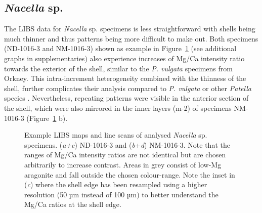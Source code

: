 \documentclass[
  authoryear,
  preprint,
  3p]{elsarticle}
\begin{document}
\subsection{\texorpdfstring{\emph{Nacella}
sp.}{Nacella sp.}}\label{nacella-sp.}

The LIBS data for \emph{Nacella} sp. specimens is less straightforward
with shells being much thinner and thus patterns being more difficult to
make out. Both specimens (ND-1016-3 and NM-1016-3) shown as example in
Figure~\ref{fig-Nac_LIBS} (see additional graphs in supplementaries)
also experience increases of Mg/Ca intensity ratio towards the exterior
of the shell, similar to the \emph{P. vulgata} specimens from Orkney.
This intra-increment heterogeneity combined with the thinness of the
shell, further complicates their analysis compared to \emph{P. vulgata}
or other \emph{Patella} species \citep{Hausmann2019-fi}. Nevertheless,
repeating patterns were visible in the anterior section of the shell,
which were also mirrored in the inner layers (m-2) of specimens
NM-1016-3 (Figure~\ref{fig-Nac_LIBS} b).

\begin{figure}[H]


\caption{\label{fig-Nac_LIBS}Example LIBS maps and line scans of
analysed \emph{Nacella} sp. specimens. (\emph{a+c}) ND-1016-3 and
(\emph{b}+\emph{d}) NM-1016-3. Note that the ranges of Mg/Ca intensity
ratios are not identical but are chosen arbitrarily to increase
contrast. Areas in grey consist of low-Mg aragonite and fall outside the
chosen colour-range. Note the inset in (\emph{c}) where the shell edge
has been resampled using a higher resolution (50 µm instead of 100 µm)
to better understand the Mg/Ca ratios at the shell edge.}

\end{figure}%
\end{document}
